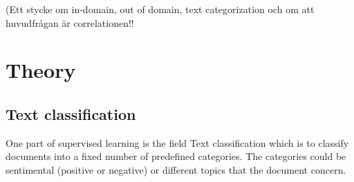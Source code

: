 (Ett stycke om in-domain, out of domain, text categorization och om att huvudfrågan är correlationen!!



\section{Theory}

\subsection{Text classification}
One part of supervised learning is the field Text classification which is to classify documents into a fixed number of predefined categories. The categories could be sentimental (positive or negative) or different topics that the document concern.

